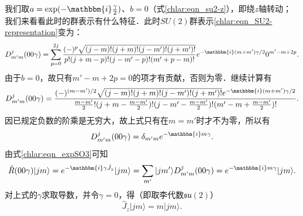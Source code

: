 我们取$a=\exp(-\mathbbm{i}\frac{\gamma}{2})$、$ b=0$（式\eqref{chlar:eqn_su2-z}），即绕$z$轴转动；
我们来看看此时的群表示有什么特征．此时$SU(2)$群表示\eqref{chlar:eqn_SU2-representation}变为：
\begin{align*}
    D^{j}_{m'm}(00\gamma) =  \sum_{p=0}^{2j}  
    \frac{(-)^{p}  \sqrt{(j-m)! (j+m)! (j-m')! (j+m')!}   } 
    {p!(j+m-p)! (j-m'-p)! (m'+p-m)!} 
    {e}^{-\mathbbm{i}(m+m') \gamma / 2} 0^{m'-m+2p}.
\end{align*}  %
由于$b=0$，故只有$m'-m+2p=0$的项才有贡献，否则为零．继续计算有
\begin{align*}
    D^{j}_{m'm}(00\gamma) = 
    \frac{(-)^{(m-m')/2}  \sqrt{(j-m)! (j+m)! (j-m')! (j+m')!}  {e}^{-\mathbbm{i}(m+m') \gamma / 2} } 
    {\frac{m-m'}{2}!(j+m-\frac{m-m'}{2})! (j-m'-\frac{m-m'}{2})! (m'-m+\frac{m-m'}{2})!}     .
\end{align*}
因已规定负数的阶乘是无穷大，故上式只有在$m=m'$时才不为零，所以有
\begin{equation}\label{chlar:eqn_z-rep}
    D^{j}_{m'm}(00\gamma) =\delta_{m'm} {e}^{-\mathbbm{i}m \gamma} .
\end{equation}
由式\eqref{chlar:eqn_expSO3}可知
\begin{equation}
    \hat{R}(00\gamma)|jm\rangle = e^{-\mathbbm{i}\gamma \hat{J}_z} |jm\rangle
    = \sum_{m'} |jm'\rangle  D^{j}_{m'm}(00\gamma) 
    = {e}^{-\mathbbm{i}m \gamma} |jm\rangle.
\end{equation}
对上式的$\gamma$求取导数，并令$\gamma=0$，得（即取李代数$\mathfrak{su}(2)$）
\begin{equation}\label{chlar:eqn_Jzpsi}
    \hat{J}_z|jm\rangle = m |jm\rangle.
\end{equation}


